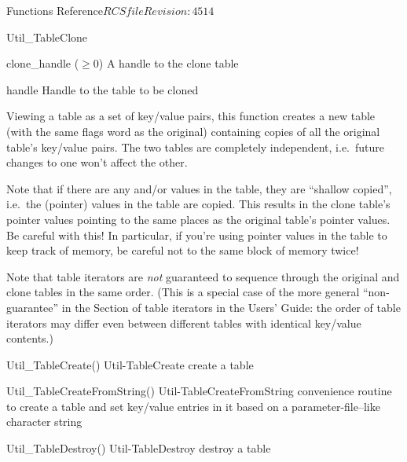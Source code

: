 \begin{cactuspart}{ Functions Reference}{$RCSfile$}{$Revision: 4514 $}
\begin{FunctionDescription}{Util\_TableClone}
\begin{ResultSection}
\begin{Result}{clone\_handle ($\ge 0$)}
A handle to the clone table
\end{Result}
\end{ResultSection}

\begin{ParameterSection}
\begin{Parameter}{handle}
Handle to the table to be cloned
\end{Parameter}
\end{ParameterSection}

\begin{Discussion}
Viewing a table as a set of key/value pairs, this function creates
a new table (with the same flags word as the original) containing
copies of all the original table's key/value pairs.  The two tables
are completely independent, i.e.\ future changes to one won't affect
the other.

Note that if there are any  and/or 
values in the table, they are ``shallow copied'', i.e.\ the (pointer)
values in the table are copied.  This results in the clone table's
pointer values pointing to the same places as the original table's
pointer values.  Be careful with this!  In particular,
if you're using pointer values in the table to keep track of
 memory, be careful not to 
the same block of memory twice!

Note that table iterators are {\em not\/} guaranteed to sequence
through the original and clone tables in the same order.  (This
is a special case of the more general ``non-guarantee'' in
the Section of table iterators in the Users' Guide:
the order of table iterators may differ even between different
tables with identical key/value contents.)
\end{Discussion}

\begin{SeeAlsoSection}
\begin{SeeAlso2} {Util\_TableCreate()} {Util-TableCreate}
create a table
\end{SeeAlso2}
\begin{SeeAlso2} {Util\_TableCreateFromString()} {Util-TableCreateFromString}
convenience routine to create a table and set key/value entries
in it based on a parameter-file--like character string
\end{SeeAlso2}
\begin{SeeAlso2} {Util\_TableDestroy()} {Util-TableDestroy}
destroy a table
\end{SeeAlso2}
\end{SeeAlsoSection}


\end{FunctionDescription}
\end{cactuspart}
